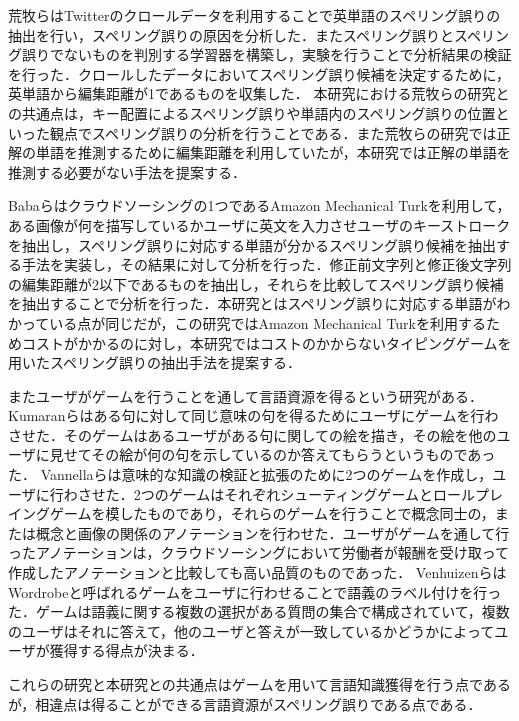 \documentclass{jarticle}
\begin{document}
荒牧らはTwitterのクロールデータを利用することで英単語のスペリング誤りの抽出を行い，スペリング誤りの原因を分析した\cite{aramakiNLP2010}．またスペリング誤りとスペリング誤りでないものを判別する学習器を構築し，実験を行うことで分析結果の検証を行った．クロールしたデータにおいてスペリング誤り候補を決定するために，英単語から編集距離が1であるものを収集した．
本研究における荒牧らの研究との共通点は，キー配置によるスペリング誤りや単語内のスペリング誤りの位置といった観点でスペリング誤りの分析を行うことである．また荒牧らの研究では正解の単語を推測するために編集距離を利用していたが，本研究では正解の単語を推測する必要がない手法を提案する．

Babaらはクラウドソーシングの1つであるAmazon Mechanical Turkを利用して，ある画像が何を描写しているかユーザに英文を入力させユーザのキーストロークを抽出し，スペリング誤りに対応する単語が分かるスペリング誤り候補を抽出する手法を実装し，その結果に対して分析を行った\cite{babaACL2012}．修正前文字列と修正後文字列の編集距離が2以下であるものを抽出し，それらを比較してスペリング誤り候補を抽出することで分析を行った．本研究とはスペリング誤りに対応する単語がわかっている点が同じだが，この研究ではAmazon Mechanical Turkを利用するためコストがかかるのに対し，本研究ではコストのかからないタイピングゲームを用いたスペリング誤りの抽出手法を提案する．

またユーザがゲームを行うことを通して言語資源を得るという研究がある．Kumaranらはある句に対して同じ意味の句を得るためにユーザにゲームを行わさせた\cite{kumaranCOLING2014}．そのゲームはあるユーザがある句に関しての絵を描き，その絵を他のユーザに見せてその絵が何の句を示しているのか答えてもらうというものであった．
Vannellaらは意味的な知識の検証と拡張のために2つのゲームを作成し，ユーザに行わさせた\cite{vannella2014validating}．2つのゲームはそれぞれシューティングゲームとロールプレイングゲームを模したものであり，それらのゲームを行うことで概念同士の，または概念と画像の関係のアノテーションを行わせた．ユーザがゲームを通して行ったアノテーションは，クラウドソーシングにおいて労働者が報酬を受け取って作成したアノテーションと比較しても高い品質のものであった．
VenhuizenらはWordrobeと呼ばれるゲームをユーザに行わせることで語義のラベル付けを行った\cite{venhuizen2013gamification}．ゲームは語義に関する複数の選択がある質問の集合で構成されていて，複数のユーザはそれに答えて，他のユーザと答えが一致しているかどうかによってユーザが獲得する得点が決まる．

これらの研究と本研究との共通点はゲームを用いて言語知識獲得を行う点であるが，相違点は得ることができる言語資源がスペリング誤りである点である．
\end{document}
